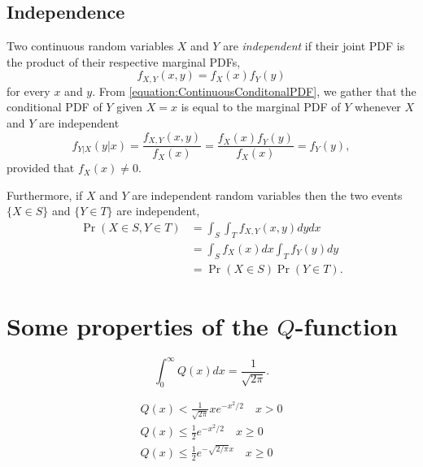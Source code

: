 \begin{example}
\end{example}

\subsection{Independence}

Two continuous random variables $X$ and $Y$ are \emph{independent} if their joint PDF is the product of their respective marginal PDFs,
\begin{equation*}
f_{X,Y} (x,y) = f_X (x) f_Y(y)
\end{equation*}
for every $x$ and $y$.
From \eqref{equation:ContinuousConditonalPDF}, we gather that the conditional PDF of $Y$ given $X=x$ is equal to the marginal PDF of $Y$ whenever $X$ and $Y$ are independent
\begin{equation*}
f_{Y|X} (y|x) = \frac{f_{X,Y} (x, y)}{f_X(x)}
= \frac{f_X (x) f_Y (y)}{f_X(x)} = f_Y (y),
\end{equation*}
provided that $f_X(x) \neq 0$.

Furthermore, if $X$ and $Y$ are independent random variables then the two events $\{ X \in S \}$ and $\{ Y \in T \}$ are independent,
\begin{equation*}
\begin{split}
\Pr (X \in S, Y \in T) &= \int_S \int_T f_{X,Y} (x,y) dy dx \\
&= \int_S f_X (x) dx \int_T f_Y (y) dy \\
&= \Pr (X \in S) \Pr (Y \in T).
\end{split}
\end{equation*}

\begin{example}
\end{example}


\section{Some properties of the $Q$-function}

\begin{equation*}
\int_0^{\infty} Q(x) dx = \frac{1}{\sqrt{2 \pi}} .
\end{equation*}

\begin{gather*}
Q(x) < \frac{1}{\sqrt{2 \pi}} x e^{-x^2/2} \quad x > 0 \\
Q(x) \leq \frac{1}{2} e^{-x^2/2} \quad x \geq 0 \\
Q(x) \leq \frac{1}{2} e^{-\sqrt{2/\pi} x} \quad x \geq 0
\end{gather*}

